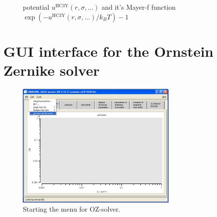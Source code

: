 \begin{figure}[htb]
\centering
  \quad
  \caption{potential $u^\text{HC3Y}(r,\sigma,\ldots)$ and it's Mayer-f function $\exp(-u^\text{HC3Y}(r,\sigma,\ldots)/k_BT)-1$}
\end{figure}

\newpage

\section{GUI interface for the Ornstein Zernike solver}

\begin{figure}[htb]
\begin{center}
\includegraphics[width=0.708\textwidth,height=0.5\textwidth]{../images/OZsolver/startOZsolver.png}
\end{center}
\caption{Starting the menu for OZ-solver. }
\label{fig:startOZsolver}
\end{figure}

